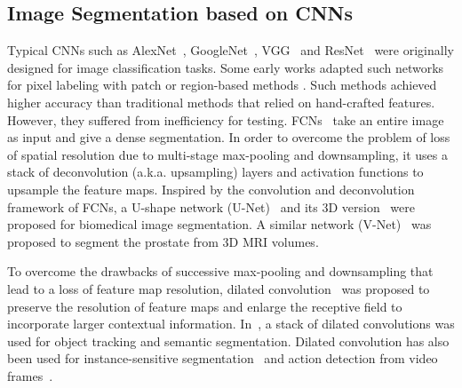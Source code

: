 \documentclass[10pt,journal,compsoc]{IEEEtran}
\begin{document}
\subsection{Image Segmentation based on CNNs}
Typical CNNs such as AlexNet~\cite{Krizhevsky2012}, GoogleNet~\cite{Szegedy2015}, VGG~\cite{Simonyan2015} and ResNet~\cite{He2015res} were originally designed for image classification tasks. Some early works adapted such networks for pixel labeling with patch or region-based methods \cite{Havaei2016, Girshick2014}. 
Such methods achieved higher accuracy than traditional methods that relied on hand-crafted features. However, they suffered from inefficiency for testing. FCNs~\cite{Long2014} take an entire image as input and give a dense segmentation. In order to overcome the problem of loss of spatial resolution due to multi-stage max-pooling and downsampling, it uses a stack of deconvolution (a.k.a. upsampling) layers and activation functions to upsample the feature maps. %
Inspired by the convolution and deconvolution framework of FCNs, a U-shape network (U-Net)~\cite{Hefny2015a} and its 3D version~\cite{Abdulkadir2016} were proposed %
for biomedical image segmentation. A similar network (V-Net)~\cite{Milletari2016} was proposed  to segment the prostate from 3D MRI volumes.


To overcome the drawbacks of successive max-pooling and downsampling that lead to a loss of feature map resolution, dilated convolution~\cite{Chen2015iclr, Onvolutions2016} was proposed to preserve the resolution of feature maps and enlarge the receptive field to incorporate larger contextual information. In~\cite{Ondruska2016}, a stack of dilated convolutions was used for object tracking and semantic segmentation. Dilated convolution has also been used for instance-sensitive segmentation~\cite{Dai2016} and action detection from video frames~\cite{Lea2016}.
\end{document}
